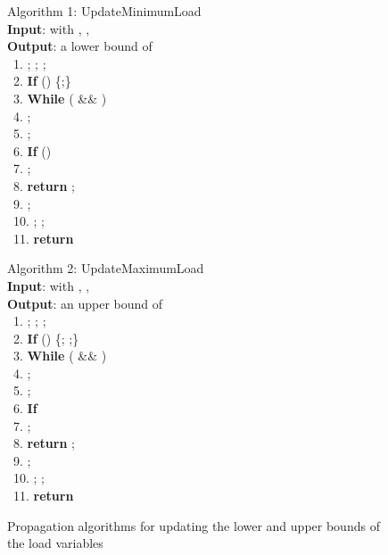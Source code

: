 \begin{figure}[t]
\begin{small}
\centering

  \begin{minipage}{.45\textwidth}
  \centering


\begin{coden}
{ Algorithm 1: UpdateMinimumLoad} \\
  {\bf Input}:  with , ,  \\
  {\bf Output}: a lower bound of  \\
  ~1.  ; ; ; \\
  ~2.  {\bf If} () \{;\} \\
  ~3.  {\bf While} ( \&\& ) \\
  ~4.   \> \> ;\\~5.   \> \> ;   \\ 
  ~6.   \> \> {\bf If} () \\ 
  ~7.   \> \> \> \> ;\\
  ~8.   \> \> \> \> {\bf return} ;\\
  ~9.   \> \> ; \\ 
  ~10. \> \> ;  ; \\
  ~11. {\bf return}  \\
  \end{coden}

\end{minipage}
\end{small}
\begin{minipage}{0.45\textwidth}  
  \centering
  \vspace{-0.3cm}

\begin{small}
\begin{coden}
{Algorithm 2: UpdateMaximumLoad}\\
   {\bf Input}:  with  , , \\
   {\bf Output}: an upper bound of  \\
  ~1.  ; ; ; \\
  ~2.  {\bf If} () \{; ;\} \\
  ~3.  {\bf While} ( \&\& ) \\
  ~4.   \> \> ;   \\ ~5.   \> \> ;   \\ 
  ~6.   \> \> {\bf If}  \\ 
  ~7.   \> \> \> \> ;\\
  ~8.   \> \> \> \> {\bf return} ;\\
  ~9.   \> \> ; \\
  ~10. \> \> ; ; \\
  ~11. {\bf return} 
  \end{coden}
\end{small}
\end{minipage}
\caption{Propagation algorithms for updating the lower and upper bounds of the load variables \label{propalgo}}
\end{figure}

